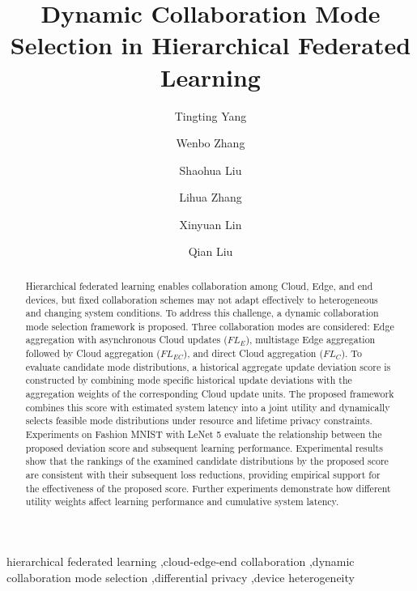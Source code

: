 \documentclass[5p,times]{elsarticle}
\theoremstyle{plain}
\theoremstyle{definition}
\theoremstyle{remark}
\begin{document}
	
	\begin{frontmatter}
		
		\title{Dynamic Collaboration Mode Selection in Hierarchical Federated Learning}
		
		\author[bupt1,bupt2,bupt3]{Tingting Yang}
		\author[bupt1,bupt2,bupt3]{Wenbo Zhang}
		\author[bupt1,bupt2,bupt3]{Shaohua Liu}
		\author[bupt1,bupt2,bupt3]{Lihua Zhang}
		\author[bupt1,bupt2,bupt3]{Xinyuan Lin}
		\author[bupt1,bupt2,bupt3]{Qian Liu}
		
		
		
		
		\begin{abstract}
			Hierarchical federated learning enables collaboration among Cloud, Edge, and end devices, but fixed collaboration schemes may not adapt effectively to heterogeneous and changing system conditions.
			To address this challenge, a dynamic collaboration mode selection framework is proposed. Three collaboration modes are considered: Edge aggregation with asynchronous Cloud updates ($FL_E$), multistage Edge aggregation followed by Cloud aggregation ($FL_{EC}$), and direct Cloud aggregation ($FL_C$).
			To evaluate candidate mode distributions, a historical aggregate update deviation score is constructed by combining mode specific historical update deviations with the aggregation weights of the corresponding Cloud update units.
			The proposed framework combines this score with estimated system latency into a joint utility and dynamically selects feasible mode distributions under resource and lifetime privacy constraints.
			Experiments on Fashion MNIST with LeNet 5 evaluate the relationship between the proposed deviation score and subsequent learning performance. 
			Experimental results show that the rankings
			of the examined candidate distributions by
			the proposed score are consistent with their
			subsequent loss reductions, providing
			empirical support for the effectiveness
			of the proposed score.
			Further experiments demonstrate how different
			utility weights affect learning performance
			and cumulative system latency.
		\end{abstract}
		
		\begin{keyword} 
			hierarchical federated learning \sep cloud-edge-end collaboration \sep dynamic collaboration mode selection \sep differential privacy \sep device heterogeneity 
		\end{keyword}
		
	\end{frontmatter}
\end{document}
